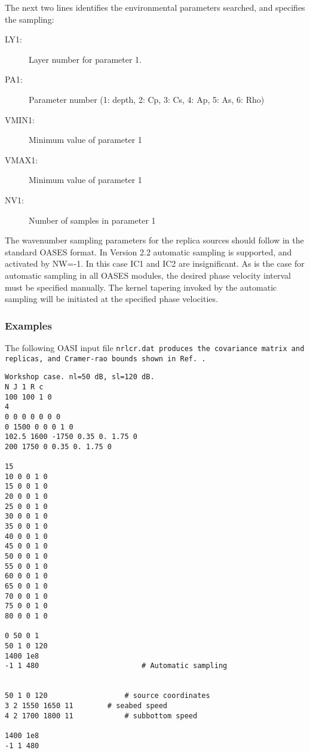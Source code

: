 The next two lines identifies the environmental parameters searched,
and specifies the sampling:

\begin{description}
\item[LY1:] Layer number for parameter 1.
\item[PA1:] Parameter number (1: depth, 2: Cp, 3: Cs, 4: Ap, 5: As, 6:
Rho)
\item[VMIN1:] Minimum value of parameter 1
\item[VMAX1:] Minimum value of parameter 1
\item[NV1:] Number of samples in parameter 1
\end{description}



The wavenumber sampling parameters for the replica sources should
follow in the standard OASES format. In Version 2.2 automatic sampling
is supported, and activated by NW=-1. In this case IC1 and IC2 are
insignificant. As is the case for automatic sampling in all OASES
modules, the desired phase velocity interval must be specified
manually. The kernel tapering invoked by the automatic sampling will
be initiated at the specified phase velocities.


\subsubsection{Examples}
\label{sec:oasiex}

The following OASI input file \tt nrlcr.dat \rm produces the
covariance matrix and replicas, and Cramer-rao bounds shown in
Ref.\,\cite{Saclant94}.

\small
\begin{verbatim}
Workshop case. nl=50 dB, sl=120 dB.
N J 1 R c  
100 100 1 0
4
0 0 0 0 0 0 0
0 1500 0 0 0 1 0
102.5 1600 -1750 0.35 0. 1.75 0
200 1750 0 0.35 0. 1.75 0

15
10 0 0 1 0
15 0 0 1 0
20 0 0 1 0
25 0 0 1 0
30 0 0 1 0
35 0 0 1 0
40 0 0 1 0
45 0 0 1 0
50 0 0 1 0
55 0 0 1 0
60 0 0 1 0
65 0 0 1 0
70 0 0 1 0
75 0 0 1 0
80 0 0 1 0

0 50 0 1
50 1 0 120
1400 1e8
-1 1 480                        # Automatic sampling


50 1 0 120             		# source coordinates
3 2 1550 1650 11		# seabed speed
4 2 1700 1800 11	        # subbottom speed

1400 1e8
-1 1 480

\end{verbatim}
\normalsize

